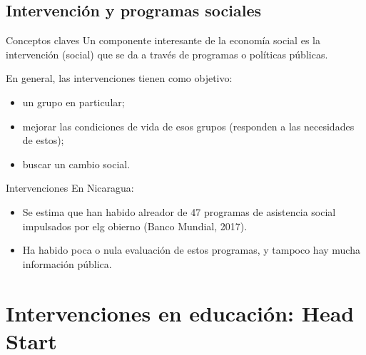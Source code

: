 \documentclass[11pt, aspectratio=169, compress]{beamer}
\begin{document}
\subsection{Intervención y programas sociales}
\begin{frame}[t]{Conceptos claves} 
	Un componente interesante de la economía social es la intervención (social) que se da a través de programas o políticas públicas. 
	
	En general, las intervenciones tienen como objetivo: 
	\begin{itemize}
		\item un grupo en particular; 
		\item mejorar las condiciones de vida de esos grupos (responden a las necesidades de estos); 
		\item buscar un cambio social. 
	\end{itemize}
\end{frame}
\begin{frame}[t]{Intervenciones} 
En Nicaragua: 
\begin{itemize}
	\item Se estima que han habido alreador de 47 programas de asistencia social impulsados por elg obierno (Banco Mundial, 2017).
	\item Ha habido poca o nula evaluación de estos programas, y  tampoco hay mucha información pública. 
\end{itemize}
\end{frame}
\section{Intervenciones en educación: Head Start}
\end{document}
